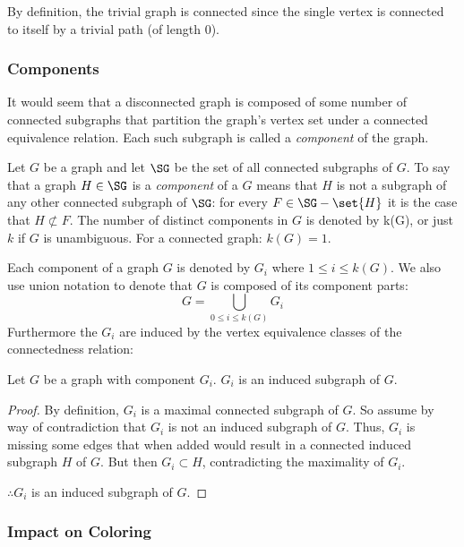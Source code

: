 By definition, the trivial graph is connected since the single vertex is connected to itself by a trivial path (of
length \(0\)).

\subsubsection{Components}\label{sec:sub:sub:components}

It would seem that a disconnected graph is composed of some number of connected subgraphs that partition the
graph's vertex set under a connected equivalence relation.  Each such subgraph is called a \emph{component} of the
graph.

Let \(G\) be a graph and let \(\SG\) be the set of all connected subgraphs of \(G\).  To say that a graph
\(H\in\SG\) is a \emph{component} of a \(G\) means that \(H\) is not a subgraph of any other connected subgraph of
\(\SG\): for every \(F\in\SG-\set{H}\) it is the case that \(H\not\subset F\).  The number of distinct components
in \(G\) is denoted by k(G), or just \(k\) if \(G\) is unambiguous.  For a connected graph: \(k(G)=1\).

Each component of a graph \(G\) is denoted by \(G_i\) where \(1\le i\le k(G)\).  We also use union notation to
denote that \(G\) is composed of its component parts:
\[G=\bigcup_{0\le i\le k(G)}G_i\]
Furthermore the \(G_i\) are induced by the vertex equivalence classes of the connectedness relation:

\begin{theorem}
  Let \(G\) be a graph with component \(G_i\).  \(G_i\) is an induced subgraph of \(G\).
\end{theorem}

\begin{proof}
  By definition, \(G_i\) is a maximal connected subgraph of \(G\).  So assume by way of contradiction that
  \(G_i\) is not an induced subgraph of \(G\).  Thus, \(G_i\) is missing some edges that when added would result in a
  connected induced subgraph \(H\) of \(G\).  But then \(G_i\subset H\), contradicting the maximality of \(G_i\).

  \(\therefore G_i\) is an induced subgraph of \(G\).
\end{proof}

\subsubsection{Impact on Coloring}\label{sec:sub:sub:impact}

